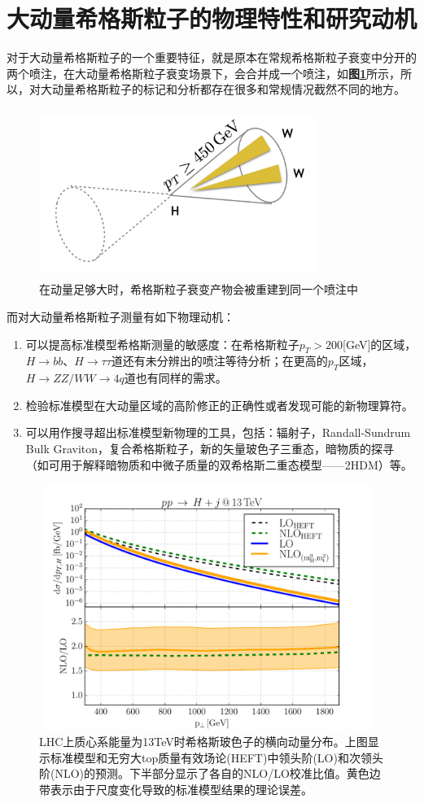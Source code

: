\section{大动量希格斯粒子的物理特性和研究动机}
对于大动量希格斯粒子的一个重要特征，就是原本在常规希格斯粒子衰变中分开的两个喷注，在大动量希格斯粒子衰变场景下，会合并成一个喷注，如\textbf{图\ref{fig:2.1}}所示，所以，对大动量希格斯粒子的标记和分析都存在很多和常规情况截然不同的地方。
\begin{figure}[H]
 \centering
 \includegraphics[height=5.5cm, width=9cm]{pictures/mergedjet.jpg}
  \caption{在动量足够大时，希格斯粒子衰变产物会被重建到同一个喷注中}
 \label{fig:2.1}
\end{figure}

而对大动量希格斯粒子测量有如下物理动机：
\begin{enumerate}
    \item 可以提高标准模型希格斯测量的敏感度：在希格斯粒子$p_T>200$[GeV]的区域，$H\to bb$、$H\to\tau\tau$道还有未分辨出的喷注等待分析；在更高的$p_T$区域，$H\to ZZ/WW\to 4q$道也有同样的需求。
    \item 检验标准模型在大动量区域的高阶修正的正确性或者发现可能的新物理算符\cite{SMEFT}。
    \item 可以用作搜寻超出标准模型新物理的工具，包括：辐射子，Randall-Sundrum Bulk Graviton，复合希格斯粒子，新的矢量玻色子三重态，暗物质的探寻（如可用于解释暗物质和中微子质量的双希格斯二重态模型——2HDM\cite{2HDM}）等。
\end{enumerate}

\begin{figure}[H]
 \centering
 \includegraphics[height=8cm, width=11cm]{pictures/SM_NLO:LO.png}
  \caption{LHC上质心系能量为13TeV时希格斯玻色子的横向动量分布。上图显示标准模型和无穷大top质量有效场论(HEFT)中领头阶(LO)和次领头阶(NLO)的预测。下半部分显示了各自的NLO/LO校准比值。黄色边带表示由于尺度变化导致的标准模型结果的理论误差。\cite{Higgs_high_pt}}
 \label{fig:2.2}
\end{figure}

